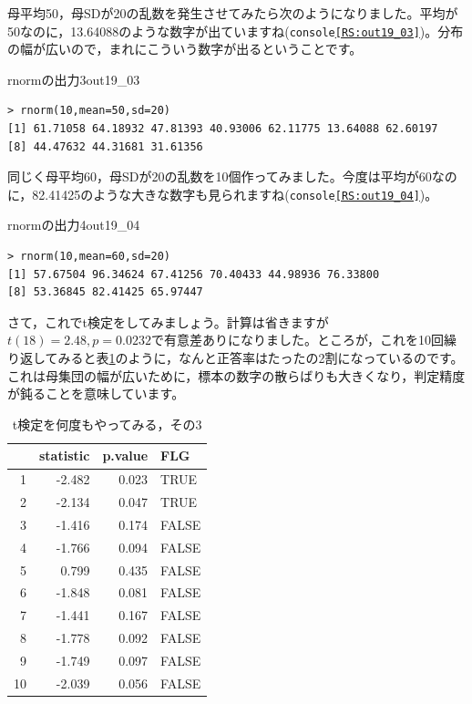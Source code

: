 \documentclass{ltjsarticle}
\begin{document}
{母平均50，母SDが20の乱数を発生させてみたら次のようになりました。平均が50なのに，13.64088のような数字が出ていますね(\texttt{console\ref{RS:out19_03}})。分布の幅が広いので，まれにこういう数字が出るということです。
\begin{Rscreen}{rnormの出力3}{out19_03}
	\begin{verbatim}
> rnorm(10,mean=50,sd=20)
[1] 61.71058 64.18932 47.81393 40.93006 62.11775 13.64088 62.60197
[8] 44.47632 44.31681 31.61356
\end{verbatim}
\end{Rscreen}

同じく母平均60，母SDが20の乱数を10個作ってみました。今度は平均が60なのに，82.41425のような大きな数字も見られますね(\texttt{console\ref{RS:out19_04}})。
\begin{Rscreen}{rnormの出力4}{out19_04}
	\begin{verbatim}
> rnorm(10,mean=60,sd=20)
[1] 57.67504 96.34624 67.41256 70.40433 44.98936 76.33800
[8] 53.36845 82.41425 65.97447
\end{verbatim}
\end{Rscreen}

さて，これでt検定をしてみましょう。計算は省きますが$t(18)=2.48,p=0.0232$で有意差ありになりました。ところが，これを10回繰り返してみると表\ref{tbl::19_05}のように，なんと正答率はたったの2割になっているのです。これは母集団の幅が広いために，標本の数字の散らばりも大きくなり，判定精度が鈍ることを意味しています。

\begin{table}[ht]
	\centering
	\caption{t検定を何度もやってみる，その3}
	\begin{tabular}{rrrl}
		\hline
		   & statistic & p.value & FLG   \\
		\hline
		1  & -2.482    & 0.023   & TRUE  \\
		2  & -2.134    & 0.047   & TRUE  \\
		3  & -1.416    & 0.174   & FALSE \\
		4  & -1.766    & 0.094   & FALSE \\
		5  & 0.799     & 0.435   & FALSE \\
		6  & -1.848    & 0.081   & FALSE \\
		7  & -1.441    & 0.167   & FALSE \\
		8  & -1.778    & 0.092   & FALSE \\
		9  & -1.749    & 0.097   & FALSE \\
		10 & -2.039    & 0.056   & FALSE \\
		\hline
	\end{tabular}
	\label{tbl::19_05}
\end{table}

}
\end{document}

